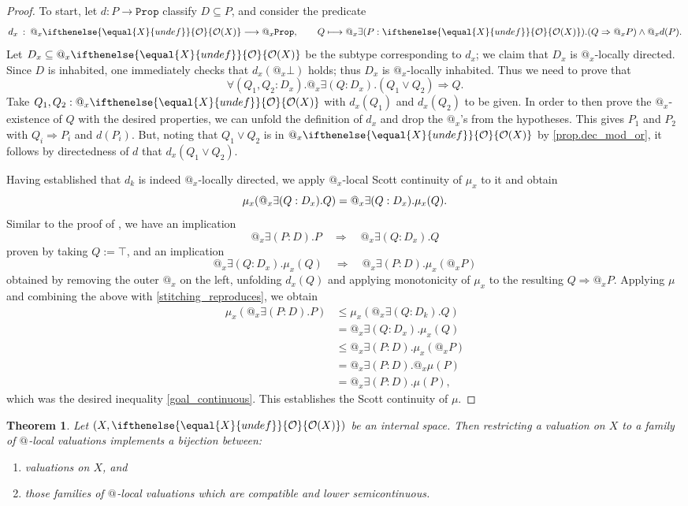 \documentclass[reqno,11pt]{amsproc}
\makeatletter
\theoremstyle{plain}
\newtheorem{theorem}{Theorem}[section]
\theoremstyle{definition}
\newcommand{\Const}[1]{\mathtt{#1}}
\renewcommand{\to}[1][]{\xrightarrow{#1}}
\newcommand{\prop}{\Const{Prop}}
\newcommand{\pt}{x}
\newcommand{\Op}[1][undef]{\ifthenelse{\equal{#1}{undef}}{\mathcal{O}}{\mathcal{O}(#1)}}
\newcommand{\atsymbol}{{@}}
\newcommand{\at}[1][\pt]{\atsymbol_{#1}}
\newcommand{\imp}{\Rightarrow}
\let\originalleft\left
\let\originalright\right
\renewcommand{\left}{\mathopen{}\mathclose\bgroup\originalleft}
\renewcommand{\right}{\aftergroup\egroup\originalright}
\numberwithin{equation}{section}
\makeatother
\begin{document}
\begin{proof}
To start, let $d\colon P\to\prop$ classify $D\subseteq P$, and consider the predicate
	\[
		d_\pt \: : \: \at \Op[X] \longrightarrow \at \prop, \qquad Q \longmapsto \at \exists (P : \Op[X]) . (Q \imp \at P) \land \at d(P).
	\]
	Let $D_\pt\subseteq\at\Op[X]$ be the subtype corresponding to $d_\pt$; we claim that $D_\pt$ is $\at$-locally directed. Since $D$ is inhabited, one immediately checks that $d_\pt(\at\bot)$ holds; thus $D_\pt$ is $\at$-locally inhabited. Thus we need to prove that
\[
		\forall(Q_1, Q_2 : D_\pt ) .\at \exists (Q : D_\pt) .(Q_1 \lor Q_2)  \imp Q.
\]
	Take $Q_1, Q_2 : \at \Op[X]$ with $d_\pt(Q_1)$ and $d_\pt(Q_2)$ to be given. In order to then prove the $\at$-existence of $Q$ with the desired properties, we can unfold the definition of $d_\pt$ and drop the $\at$'s from the hypotheses. This gives $P_1$ and $P_2$ with $Q_i \imp P_i$ and $d(P_i)$. But, noting that $Q_1\lor Q_2$ is in $\at\Op[X]$ by \cref{prop.dec_mod_or}, it follows by directedness of $d$ that $d_\pt(Q_1 \lor Q_2)$.

	Having established that $d_k$ is indeed $\at$-locally directed, we apply $\at$-local Scott continuity of $\mu_\pt$ to it and obtain
\[
		\mu_\pt\left( \at \exists (Q : D_\pt). Q \right) = 
		\at \exists (Q : D_\pt) . \mu_\pt(Q).
\]
	Similar to the proof of , we have an implication
	\[
		\at \exists (P : D). P \quad \Longrightarrow \quad \at \exists (Q : D_\pt) . Q
	\]
	proven by taking $Q := \top$, and an implication
	\[
		\at \exists (Q : D_\pt) . \mu_\pt(Q) \quad \Longrightarrow \quad \at \exists (P : D) . \mu_\pt(\at P)
	\]
	obtained by removing the outer $\at$ on the left, unfolding $d_\pt(Q)$ and applying monotonicity of $\mu_\pt$ to the resulting $Q \imp \at P$. Applying $\mu$ and combining the above with \eqref{stitching_reproduces}, we obtain
	\begin{align*}
			\mu_\pt(\at \exists (P : D) . P) &\le
			\mu_\pt(\at \exists (Q : D_k). Q)\\&=
			\at \exists (Q : D_\pt).\mu_\pt(Q)\\&\le
			\at \exists (P : D). \mu_\pt(\at P)\\&=
			\at \exists (P : D). \at\mu(P)\\&=
			\at \exists (P : D). \mu(P),
  \end{align*}
which was the desired inequality \eqref{goal_continuous}. This establishes the Scott continuity of $\mu$.
\end{proof}

\begin{theorem}
	\label{main_internal}
	Let $(X,\Op[X])$ be an internal space. Then restricting a valuation on $X$ to a family of $\at[]$-local valuations implements a bijection between:
	\begin{enumerate}
		\item valuations on $X$, and
		\item those families of $\at[]$-local valuations which are compatible and lower semicontinuous.
	\end{enumerate}
\end{theorem}
\end{document}
